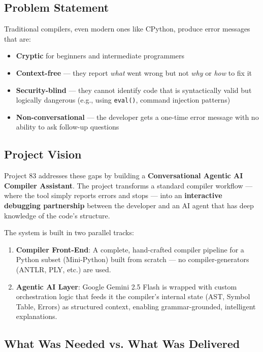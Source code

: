 \documentclass[a4paper,11pt]{article}
\begin{document}
\subsection{Problem Statement}

Traditional compilers, even modern ones like CPython, produce error messages that are:
\begin{itemize}
    \item \textbf{Cryptic} for beginners and intermediate programmers
    \item \textbf{Context-free} --- they report \textit{what} went wrong but not \textit{why} or \textit{how} to fix it
    \item \textbf{Security-blind} --- they cannot identify code that is syntactically valid but logically dangerous (e.g., using \texttt{eval()}, command injection patterns)
    \item \textbf{Non-conversational} --- the developer gets a one-time error message with no ability to ask follow-up questions
\end{itemize}

\subsection{Project Vision}

Project 83 addresses these gaps by building a \textbf{Conversational Agentic AI Compiler Assistant}. The project transforms a standard compiler workflow --- where the tool simply reports errors and stops --- into an \textbf{interactive debugging partnership} between the developer and an AI agent that has deep knowledge of the code's structure.

The system is built in two parallel tracks:
\begin{enumerate}
    \item \textbf{Compiler Front-End}: A complete, hand-crafted compiler pipeline for a Python subset (Mini-Python) built from scratch --- no compiler-generators (ANTLR, PLY, etc.) are used.
    \item \textbf{Agentic AI Layer}: Google Gemini 2.5 Flash is wrapped with custom orchestration logic that feeds it the compiler's internal state (AST, Symbol Table, Errors) as structured context, enabling grammar-grounded, intelligent explanations.
\end{enumerate}

\subsection{What Was Needed vs. What Was Delivered}
\end{document}
